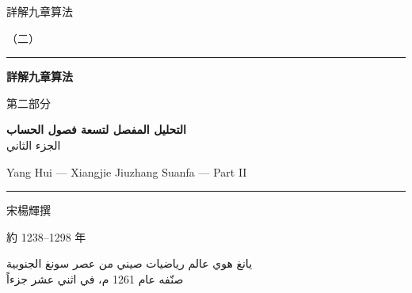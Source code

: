 \documentclass[11pt,a4paper]{article}
\begin{document}
\begin{titlepage}
\begin{center}
\vspace*{1.5cm}

{\fontsize{12}{16}\selectfont 詳解九章算法}

\vspace{0.8cm}

{\fontsize{10}{14}\selectfont （二）}

\vspace{1.5cm}

\rule{0.85\textwidth}{1.5pt}

\vspace{0.8cm}

{\fontsize{26}{34}\selectfont\bfseries\color{titlecolor} 詳解九章算法}

\vspace{0.4cm}

{\fontsize{14}{20}\selectfont\color{notecolor} 第二部分}

\vspace{0.6cm}

{\fontsize{18}{24}\selectfont\arabicfont\beginR\color{titlecolor}
\textbf{التحليل المفصل لتسعة فصول الحساب}\\[0.3cm]
{\large الجزء الثاني}\endR}

\vspace{0.4cm}

{\fontsize{12}{16}\selectfont\color{notecolor} Yang Hui --- Xiangjie Jiuzhang Suanfa --- Part II}

\vspace{0.8cm}

\rule{0.85\textwidth}{1.5pt}

\vspace{1.5cm}

{\fontsize{12}{16}\selectfont 宋\quad 楊輝\quad 撰}

\vspace{0.3cm}

{\fontsize{10}{14}\selectfont\color{notecolor} 約 1238--1298 年}

\vspace{0.8cm}

{\fontsize{11}{15}\selectfont\arabicfont\beginR\color{notecolor}
يانغ هوي \textbullet{} عالم رياضيات صيني من عصر سونغ الجنوبية\\
صنّفه عام 1261 م، في اثني عشر جزءاً
\endR}


\end{center}
\end{titlepage}
\end{document}
